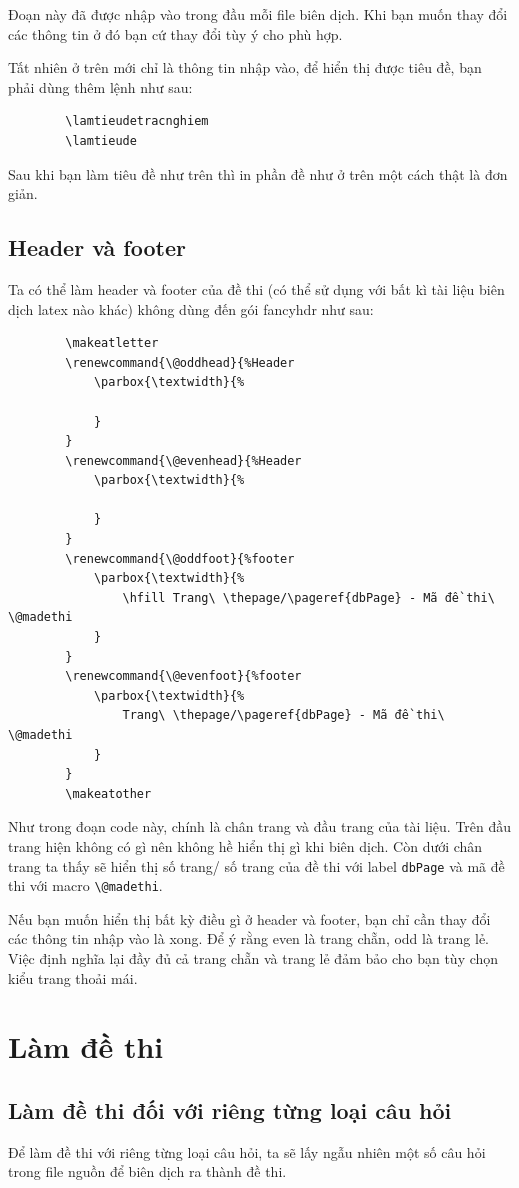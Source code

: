 	Đoạn này đã được nhập vào trong đầu mỗi file biên dịch. Khi bạn muốn thay đổi các thông tin ở đó bạn cứ thay đổi tùy ý cho phù hợp.
	
	Tất nhiên ở trên mới chỉ là thông tin nhập vào, để hiển thị được tiêu đề, bạn phải dùng thêm lệnh như sau:
	\begin{verbatim}
		\lamtieudetracnghiem
		\lamtieude
	\end{verbatim}
	\lamtieudetracnghiem
	\lamtieude
	
	Sau khi bạn làm tiêu đề như trên thì in phần đề như ở trên một cách thật là đơn giản.
	\subsection{Header và footer}
	Ta có thể làm header và footer của đề thi (có thể sử dụng với bất kì tài liệu biên dịch latex nào khác) không dùng đến gói fancyhdr như sau:
	\begin{verbatim}
		\makeatletter
		\renewcommand{\@oddhead}{%Header
			\parbox{\textwidth}{%
				
			}
		}
		\renewcommand{\@evenhead}{%Header
			\parbox{\textwidth}{%
				
			}
		}
		\renewcommand{\@oddfoot}{%footer
			\parbox{\textwidth}{%
				\hfill Trang\ \thepage/\pageref{dbPage} - Mã đề thi\ \@madethi
			}
		}
		\renewcommand{\@evenfoot}{%footer
			\parbox{\textwidth}{%
				Trang\ \thepage/\pageref{dbPage} - Mã đề thi\ \@madethi
			}
		}
		\makeatother
	\end{verbatim}
	
	Như trong đoạn code này, chính là chân trang và đầu trang của tài liệu. Trên đầu trang hiện không có gì nên không hề hiển thị gì khi biên dịch. Còn dưới chân trang ta thấy sẽ hiển thị số trang/ số trang của đề thi với label  \verb'dbPage'  và mã đề thi với macro \verb'\@madethi'.
	
	Nếu bạn muốn hiển thị bất kỳ điều gì ở header và footer, bạn chỉ cần thay đổi các thông tin nhập vào là xong. Để ý rằng even là trang chẵn, odd là trang lẻ. Việc định nghĩa lại đầy đủ cả trang chẵn và trang lẻ đảm bảo cho bạn tùy chọn kiểu trang thoải mái.
	\section{Làm đề thi}
	\subsection{Làm đề thi đối với riêng từng loại câu hỏi}
	Để làm đề thi với riêng từng loại câu hỏi, ta sẽ lấy ngẫu nhiên một số câu hỏi trong file nguồn để biên dịch ra thành đề thi.
	
